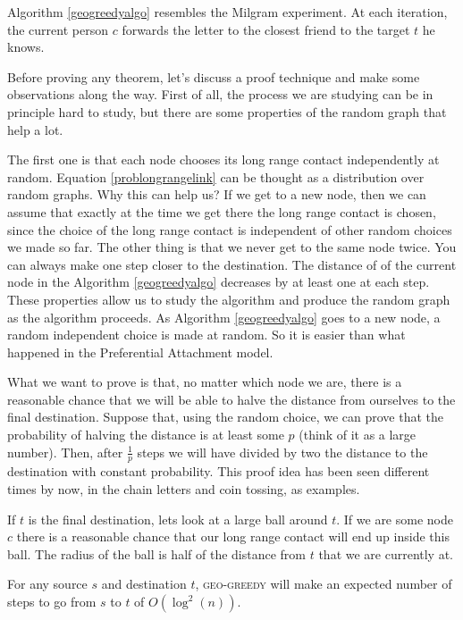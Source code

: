 Algorithm \ref{geogreedyalgo} resembles the Milgram experiment. At each iteration, the current person $c$ forwards the letter to the closest friend to the target $t$ he knows.

Before proving any theorem, let's discuss a proof technique and make some observations along the way. First of all, the process we are studying can be in principle hard to study, but there are some properties of the random graph that help a lot. 

The first one is that each node chooses its long range contact independently at random. Equation \ref{problongrangelink} can be thought as a distribution over random graphs. Why this can help us? If we get to a new node, then we can assume that exactly at the time we get there the long range contact is chosen, since the choice of the long range contact is independent of other random choices we made so far. The other thing is that we never get to the same node twice. You can always make one step closer to the destination. The distance of of the current node in the Algorithm \ref{geogreedyalgo} decreases by at least one at each step. These properties allow us to study the algorithm and produce the random graph as the algorithm proceeds. As Algorithm \ref{geogreedyalgo} goes to a new node, a random independent choice is made at random. So it is easier than what happened in the Preferential Attachment model. 

What we want to prove is that, no matter which node we are, there is a reasonable chance that we will be able to halve the distance from ourselves to the final destination. Suppose that, using the random choice, we can prove that the probability of halving the distance is at least some $p$ (think of it as a large number). Then, after $\frac{1}{p}$ steps we will have divided by two the distance to the destination with constant probability. This proof idea has been seen different times by now, in the chain letters and coin tossing, as examples.

If $t$ is the final destination, lets look at a large ball around $t$. If we are some node $c$ there is a reasonable chance that our long range contact will end up inside this ball. The radius of the ball is half of the distance from $t$ that we are currently at.

\begin{thm}
	For any source $s$ and destination $t$, \textsc{geo-greedy} will make an expected number of steps to go from $s$ to $t$ of $O\left(\log^2(n)\right)$.
\end{thm}

